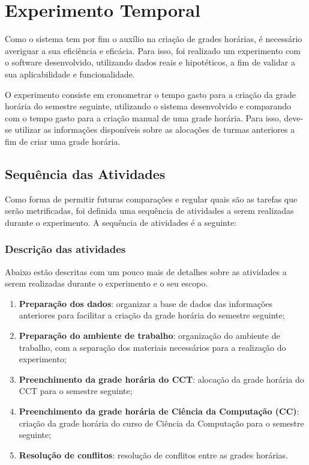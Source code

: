 \chapter{Experimento Temporal} \label{chap:experimentos}

Como o sistema tem por fim o auxílio na criação de grades horárias, é necessário averiguar a sua eficiência e eficácia. Para isso, foi realizado um experimento com o software desenvolvido, utilizando dados reais e hipotéticos, a fim de validar a sua aplicabilidade e funcionalidade.

O experimento consiste em cronometrar o tempo gasto para a criação da grade horária do semestre seguinte, utilizando o sistema desenvolvido e comparando com o tempo gasto para a criação manual de uma grade horária. Para isso, deve-se utilizar as informações disponíveis sobre as alocações de turmas anteriores a fim de criar uma grade horária.

\section{Sequência das Atividades}

Como forma de permitir futuras comparações e regular quais são as tarefas que serão metrificadas, foi definida uma sequência de atividades a serem realizadas durante o experimento. A sequência de atividades é a seguinte:

\subsection{Descrição das atividades}

Abaixo estão descritas com um pouco mais de detalhes sobre as atividades a serem realizadas durante o experimento e o seu escopo.

\begin{enumerate}
  \item \textbf{Preparação dos dados}: organizar a base de dados das informações anteriores para facilitar a criação da grade horária do semestre seguinte;
  \item \textbf{Preparação do ambiente de trabalho}: organização do ambiente de trabalho, com a separação dos materiais necessários para a realização do experimento;
  \item \textbf{Preenchimento da grade horária do CCT}: alocação da grade horária do CCT para o semestre seguinte;
  \item \textbf{Preenchimento da grade horária de Ciência da Computação (CC)}: criação da grade horária do curso de Ciência da Computação para o semestre seguinte;
  \item \textbf{Resolução de conflitos}: resolução de conflitos entre as grades horárias.
\end{enumerate}

